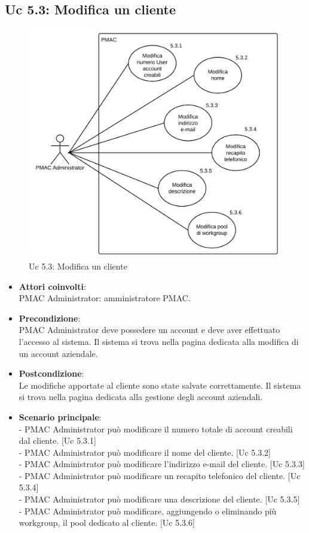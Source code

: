 {\subsection{Uc 5.3: Modifica un cliente}
\begin{figure}[ht]
\centering
\caption{Uc 5.3: Modifica un cliente}
\includegraphics[scale=0.9]{images/cap1/UseCase/Uc5_3} %
\end{figure}

\begin{itemize}
\item \textbf{Attori coinvolti}:\\
PMAC Administrator: amministratore PMAC.

\item \textbf{Precondizione}:\\
PMAC Administrator deve possedere un account e deve aver effettuato l'accesso al sistema. Il sistema si trova nella pagina dedicata alla modifica di un account aziendale.

\item \textbf{Postcondizione}:\\
Le modifiche apportate al cliente sono state salvate correttamente. Il sistema si trova nella pagina dedicata alla gestione degli account aziendali.

\item \textbf{Scenario principale}:\\
- PMAC Administrator può modificare il numero totale di account creabili dal cliente. [Uc 5.3.1]\\
- PMAC Administrator può modificare il nome del cliente. [Uc 5.3.2]\\
- PMAC Administrator può modificare l'indirizzo e-mail del cliente. [Uc 5.3.3]\\
- PMAC Administrator può modificare un recapito telefonico del cliente. [Uc 5.3.4]\\
- PMAC Administrator può modificare una descrizione del cliente. [Uc 5.3.5]\\
- PMAC Administrator può modificare, aggiungendo o eliminando più workgroup, il pool dedicato al cliente. [Uc 5.3.6]


\end{itemize}}
